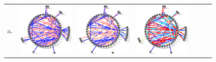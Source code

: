 \documentclass{bioinfo}
\begin{document}
\begin{figure}
  \centering
 \label{fig:plot-evol-1}
  \begin{tabular}{lcccccc}
  a.  & \includegraphics[scale=0.15]{results/ref/t1.png}
    &     \includegraphics[scale=0.15]{results/ref/t2.png}
    &     \includegraphics[scale=0.15]{results/ref/t3.png} 

\end{tabular}
\end{figure}
\end{document}
